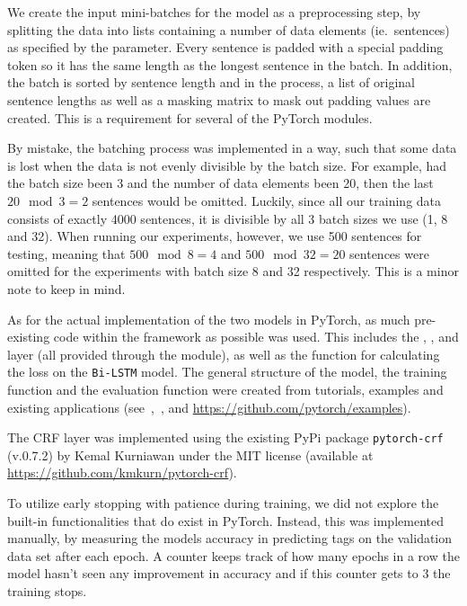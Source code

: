 We create the input mini-batches for the model as a preprocessing step, by
splitting the data into lists containing a number of data elements (ie.\
sentences) as specified by the  parameter. Every sentence is
padded with a special padding token \code{''<PAD>''} so it has the same length as
the longest sentence in the batch. In addition, the batch is sorted by sentence
length and in the process, a list of original sentence lengths as well as a
masking matrix to mask out padding values are created. This is a requirement for
several of the PyTorch modules.

By mistake, the batching process was implemented in a way, such that some data is
lost when the data is not evenly divisible by the batch size. For example, had
the batch size been 3 and the number of data elements been 20, then the last
$20\mod3 = 2$ sentences would be omitted. Luckily, since all our training data
consists of exactly 4000 sentences, it is divisible by all 3 batch sizes we use
(1, 8 and 32). When running our experiments, however, we use 500 sentences for
testing, meaning that $500\mod8 = 4$ and $500\mod32 = 20$ sentences were omitted
for the experiments with batch size 8 and 32 respectively. This is a minor note
to keep in mind.

As for the actual implementation of the two models in PyTorch, as much
pre-existing code within the framework as possible was used. This includes the
\code{Embedding}, \code{Dropout}, \code{LSTM} and \code{Linear} layer (all
provided through the \code{torch.nn} module), as well as the
 function for calculating the loss on the
\texttt{Bi-LSTM} model. The general structure of the model, the training
function and the evaluation function were created from tutorials, examples and
existing applications (see~\cite{pytorch2017lstm},~\cite{yang2018ncrf},
and \url{https://github.com/pytorch/examples}).

The CRF layer was implemented using the existing PyPi package
\texttt{pytorch-crf} (v.0.7.2) by Kemal Kurniawan under the MIT
license (available at \url{https://github.com/kmkurn/pytorch-crf}).

To utilize early stopping with patience during training, we did not explore the
built-in functionalities that do exist in PyTorch. Instead, this was implemented
manually, by measuring the models accuracy in predicting tags on the validation
data set after each epoch. A counter keeps track of how many epochs in a row the
model hasn't seen any improvement in accuracy and if this counter gets to 3 the
training stops.

